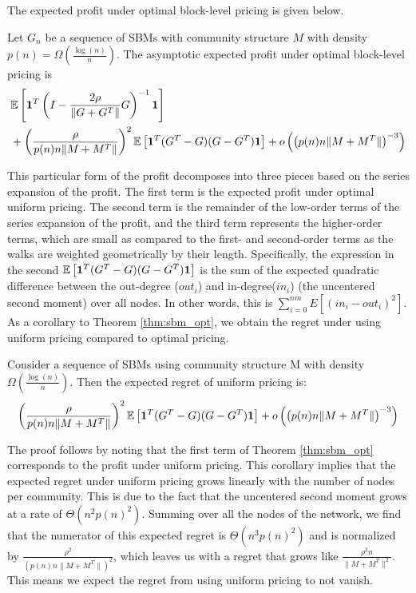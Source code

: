The expected profit under optimal block-level pricing is given below.

\begin{theorem}\label{thm:sbm_opt}
    Let $G_n$ be a sequence of SBMs with community structure $M$ with density $p(n) = \Omega\left(\frac{\log (n)}{n}\right)$. 
    The asymptotic expected profit under optimal block-level pricing is
    \begin{align*}
        &\mathbb{E}\left[\mathbf{1}^T \left(I - \frac{2\rho}{\|G+G^T\|}  G\right)^{-1} \mathbf{1}\right]\\
        &+ \left(\frac{\rho}{p(n) n \|M+M^T\|} \right)^2 \mathbb{E}\left[  \mathbf{1}^T (G^T-G)(G-G^T)\mathbf{1}\right] + o\left( \left( p(n) n \|M+M^T\| \right)^{-3} \right)
   \end{align*}
\end{theorem}
This particular form of the profit decomposes into three pieces based on the series expansion of the profit. The first term is the expected profit under optimal uniform pricing. The second term is the remainder of the low-order terms of the series expansion of the profit, and the third term represents the higher-order terms, which are small as compared to the first- and second-order terms as the walks are weighted geometrically by their length. Specifically, the expression in the second $\mathbb{E}\left[\mathbf{1}^T (G^T - G)(G-G^T) \mathbf{1}\right]$ is the sum of the expected quadratic difference between the out-degree ($out_i$) and in-degree($in_i$) (the uncentered second moment) over all nodes. In other words, this is $\sum_{i=0}^{nm} E[ (in_i - out_i)^2]$.   As a corollary to Theorem \ref{thm:sbm_opt}, we obtain the regret under using uniform pricing compared to optimal pricing.

\begin{corollary}
    \label{cor:uni_sbm_reg}
    Consider a sequence of SBMs using community structure M with density $\Omega(\frac{\log(n)}{n})$. Then the expected regret of uniform pricing is:
    \begin{equation}
        \left(\frac{\rho}{p(n) n \|M+M^T\|} \right)^2 \mathbb{E}\left[  \mathbf{1}^T (G^T-G)(G-G^T)\mathbf{1}\right] + o\left( \left(p(n) n \|M+M^T\| \right)^{-3} \right)
    \end{equation}
\end{corollary}

The proof follows by noting that the first term of Theorem \ref{thm:sbm_opt} corresponds to the profit under uniform pricing. This corollary implies that the expected regret under uniform pricing grows linearly with the number of nodes per community. This is due to the fact that the uncentered second moment grows at a rate of $\Theta(n^2 p(n)^2)$. Summing over all the nodes of the network, we find that the numerator of this expected regret is $\Theta(n^3 p(n)^2)$ and is normalized by $\frac{\rho^2}{ (p(n) n \|M+M^T\|)^2 }$, which leaves us with a regret that grows like $\frac{\rho^2 n }{\|M+M^T\|^2}$. This means we expect the regret from using uniform pricing to not vanish. 

